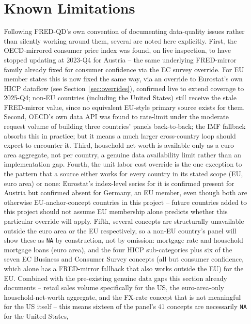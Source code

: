 \documentclass[11pt]{article}
\begin{document}
\section{Known Limitations}
\label{sec:limitations}

Following FRED-QD's own convention of documenting data-quality issues
rather than silently working around them, several are noted here explicitly.
First, the OECD-mirrored consumer price index was found, on live
inspection, to have stopped updating at 2023-Q4 for Austria -- the same
underlying FRED-mirror family already fixed for consumer confidence via
the EC survey override. For EU member states this is now fixed the same
way, via an override to Eurostat's own HICP dataflow (see
Section~\ref{sec:overrides}), confirmed live to extend coverage to
2025-Q4; non-EU countries (including the United States) still receive the
stale FRED-mirror value, since no equivalent EU-style primary source
exists for them.
Second, OECD's own data API was found to rate-limit under the moderate
request volume of building three countries' panels back-to-back; the IMF
fallback absorbs this in practice; but it means a much larger cross-country
loop should expect to encounter it. Third, household net worth is
available only as a euro-area aggregate, not per country, a genuine data
availability limit rather than an implementation gap. Fourth, the unit
labor cost override is the one exception to the pattern that a source
either works for every country in its stated scope (EU, euro area) or
none: Eurostat's index-level series for it is confirmed present for
Austria but confirmed absent for Germany, an EU member, even though both
are otherwise EU-anchor-concept countries in this project -- future
countries added to this project should not assume EU membership alone
predicts whether this particular override will apply. Fifth, several
concepts are structurally unavailable outside the euro area or the EU
respectively, so a non-EU country's panel will show these as \texttt{NA}
by construction, not by omission: mortgage rate and household mortgage
loans (euro area), and the four HICP sub-categories plus six of the seven
EC Business and Consumer Survey concepts (all but consumer confidence,
which alone has a FRED-mirror fallback that also works outside the EU)
for the EU. Combined with the pre-existing genuine data gaps this section
already documents -- retail sales volume specifically for the US, the
euro-area-only household-net-worth aggregate, and the FX-rate concept
that is not meaningful for the US itself -- this means sixteen of the
panel's 41 concepts are necessarily \texttt{NA} for the United States,
\end{document}
